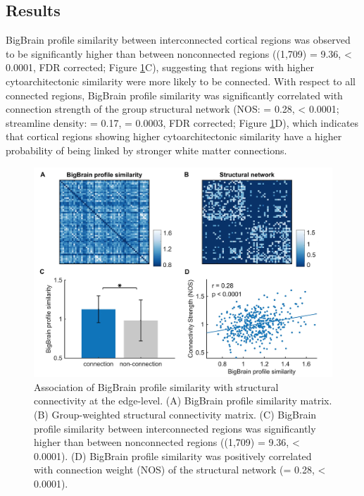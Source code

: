 \begin{refsection}
\section*{Results}
BigBrain profile similarity between interconnected cortical regions was observed to be significantly higher than between nonconnected regions (\tvaldf(1,709) = 9.36, \pval < 0.0001, FDR corrected; Figure \ref{bigbrainFig2}C), suggesting that regions with higher cytoarchitectonic similarity were more likely to be connected. With respect to all connected regions, BigBrain profile similarity was significantly correlated with connection strength of the group structural network (NOS: \rval = 0.28, 
\pval < 0.0001; streamline density: \rval = 0.17, \pval = 0.0003, FDR corrected; Figure \ref{bigbrainFig2}D), which indicates that cortical regions showing higher cytoarchitectonic similarity have a higher probability of being linked by stronger white matter connections.

\begin{figure}[h]
    \centering
    \includegraphics[width=\linewidth]{images/thesis_bb_fig2.jpg}
    \caption{Association of BigBrain profile similarity with structural connectivity at the edge-level. (A) BigBrain profile similarity matrix. (B) Group-weighted structural connectivity matrix. (C) BigBrain profile similarity between interconnected regions was significantly higher than between nonconnected regions (\tvaldf(1,709) = 9.36, \pval < 0.0001). (D) BigBrain profile similarity was positively correlated with connection weight (NOS) of the structural network (\rval = 0.28, \pval < 0.0001).}
    \label{bigbrainFig2}
\end{figure}


\end{refsection}
